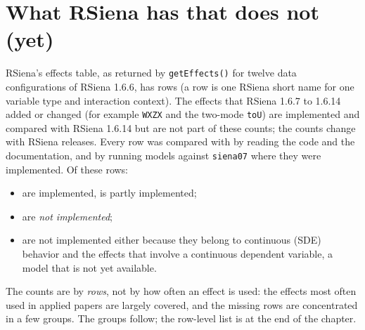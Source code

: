 \section{What RSiena has that \nwsaom{} does not (yet)}\label{sec:notimpl}
RSiena's effects table, as returned by \texttt{getEffects()} for twelve data configurations of RSiena 1.6.6, has \nTotal{} rows (a row is one RSiena short name for one variable type and interaction context). The effects that RSiena 1.6.7 to 1.6.14 added or changed (for example \texttt{WXZX} and the two-mode \texttt{toU}) are implemented and compared with RSiena 1.6.14 but are not part of these counts; the counts change with RSiena releases. Every row was compared with \nwsaom{} by reading the code and the documentation, and by running models against \texttt{siena07} where they were implemented. Of these rows:
\begin{itemize}
\item \nImpl{} are implemented, \nPartial{} is partly implemented;
\item \nNotImpl{} are \emph{not implemented};
\item \nNotPlanned{} are not implemented either because they belong to continuous (SDE) behavior and the effects that involve a continuous dependent variable, a model that is not yet available.
\end{itemize}
The counts are by \emph{rows}, not by how often an effect is used: the effects most often used in applied papers are largely covered, and the missing rows are concentrated in a few groups. The groups follow; the row-level list is at the end of the chapter.

